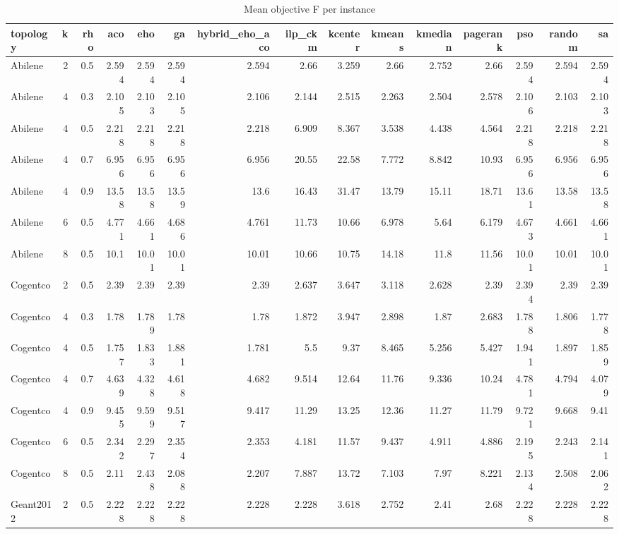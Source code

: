 \begin{table}
\caption{Mean objective F per instance}
\begin{tabular}{lrrrrrrrrrrrrrr}
\toprule
topology & k & rho & aco & eho & ga & hybrid_eho_aco & ilp_ckm & kcenter & kmeans & kmedian & pagerank & pso & random & sa \\
\midrule
Abilene & 2 & 0.5 & 2.594 & 2.594 & 2.594 & 2.594 & 2.66 & 3.259 & 2.66 & 2.752 & 2.66 & 2.594 & 2.594 & 2.594 \\
Abilene & 4 & 0.3 & 2.105 & 2.103 & 2.105 & 2.106 & 2.144 & 2.515 & 2.263 & 2.504 & 2.578 & 2.106 & 2.103 & 2.103 \\
Abilene & 4 & 0.5 & 2.218 & 2.218 & 2.218 & 2.218 & 6.909 & 8.367 & 3.538 & 4.438 & 4.564 & 2.218 & 2.218 & 2.218 \\
Abilene & 4 & 0.7 & 6.956 & 6.956 & 6.956 & 6.956 & 20.55 & 22.58 & 7.772 & 8.842 & 10.93 & 6.956 & 6.956 & 6.956 \\
Abilene & 4 & 0.9 & 13.58 & 13.58 & 13.59 & 13.6 & 16.43 & 31.47 & 13.79 & 15.11 & 18.71 & 13.61 & 13.58 & 13.58 \\
Abilene & 6 & 0.5 & 4.771 & 4.661 & 4.686 & 4.761 & 11.73 & 10.66 & 6.978 & 5.64 & 6.179 & 4.673 & 4.661 & 4.661 \\
Abilene & 8 & 0.5 & 10.1 & 10.01 & 10.01 & 10.01 & 10.66 & 10.75 & 14.18 & 11.8 & 11.56 & 10.01 & 10.01 & 10.01 \\
Cogentco & 2 & 0.5 & 2.39 & 2.39 & 2.39 & 2.39 & 2.637 & 3.647 & 3.118 & 2.628 & 2.39 & 2.394 & 2.39 & 2.39 \\
Cogentco & 4 & 0.3 & 1.78 & 1.789 & 1.78 & 1.78 & 1.872 & 3.947 & 2.898 & 1.87 & 2.683 & 1.788 & 1.806 & 1.778 \\
Cogentco & 4 & 0.5 & 1.757 & 1.833 & 1.881 & 1.781 & 5.5 & 9.37 & 8.465 & 5.256 & 5.427 & 1.941 & 1.897 & 1.859 \\
Cogentco & 4 & 0.7 & 4.639 & 4.328 & 4.618 & 4.682 & 9.514 & 12.64 & 11.76 & 9.336 & 10.24 & 4.781 & 4.794 & 4.079 \\
Cogentco & 4 & 0.9 & 9.455 & 9.599 & 9.517 & 9.417 & 11.29 & 13.25 & 12.36 & 11.27 & 11.79 & 9.721 & 9.668 & 9.41 \\
Cogentco & 6 & 0.5 & 2.342 & 2.297 & 2.354 & 2.353 & 4.181 & 11.57 & 9.437 & 4.911 & 4.886 & 2.195 & 2.243 & 2.141 \\
Cogentco & 8 & 0.5 & 2.11 & 2.438 & 2.088 & 2.207 & 7.887 & 13.72 & 7.103 & 7.97 & 8.221 & 2.134 & 2.508 & 2.062 \\
Geant2012 & 2 & 0.5 & 2.228 & 2.228 & 2.228 & 2.228 & 2.228 & 3.618 & 2.752 & 2.41 & 2.68 & 2.228 & 2.228 & 2.228 \\

\end{tabular}
\end{table}
